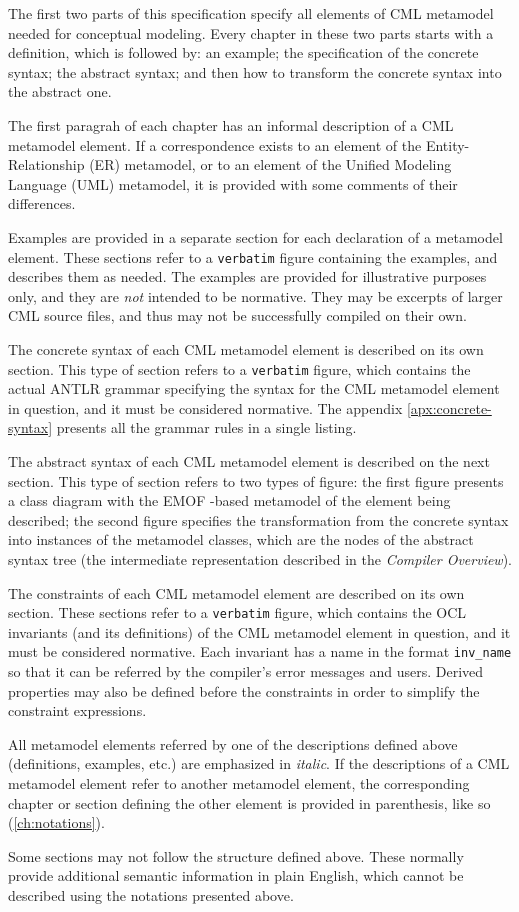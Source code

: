 The first two parts of this specification specify all elements of CML metamodel
needed for conceptual modeling.
Every chapter in these two parts starts with a definition,
which is followed by: an example;
the specification of the concrete syntax;
the abstract syntax;
and then how to transform the concrete syntax into the abstract one.

The first paragrah of each chapter has an informal description
of a CML metamodel element.
If a correspondence exists to an element of
the Entity-Relationship (ER) \cite{er} metamodel,
or to an element of the Unified Modeling Language (UML) \cite{uml} metamodel,
it is provided with some comments of their differences.

Examples are provided in a separate section
for each declaration of a metamodel element.
These sections refer to a \verb+verbatim+ figure containing the examples,
and describes them as needed.
The examples are provided for illustrative purposes only,
and they are \emph{not} intended to be normative.
They may be excerpts of larger CML source files,
and thus may not be successfully compiled on their own.

The concrete syntax of each CML metamodel element is described
on its own section.
This type of section refers to a \verb+verbatim+ figure,
which contains the actual ANTLR \cite{antlr} grammar
specifying the syntax for the CML metamodel element in question,
and it must be considered normative.
The appendix \ref{apx:concrete-syntax} presents all the grammar rules
in a single listing.

The abstract syntax of each CML metamodel element is described
on the next section.
This type of section refers to two types of figure:
the first figure presents a class diagram
with the EMOF \cite{mof}-based metamodel
of the element being described;
the second figure specifies the transformation
from the concrete syntax into instances of the metamodel classes,
which are the nodes of the abstract syntax tree
(the intermediate representation described in the \emph{Compiler Overview}).

The constraints of each CML metamodel element are described
on its own section.
These sections refer to a \verb+verbatim+ figure,
which contains the OCL \cite{ocl} invariants
(and its definitions)
of the CML metamodel element in question,
and it must be considered normative.
Each invariant has a name in the format \verb+inv_name+
so that it can be referred by the compiler's error messages
and users.
Derived properties may also be defined before the constraints
in order to simplify the constraint expressions.

All metamodel elements referred by one of the descriptions defined above
(definitions, examples, etc.) are emphasized in \emph{italic}.
If the descriptions of a CML metamodel element refer to another metamodel element,
the corresponding chapter or section defining the other element
is provided in parenthesis, like so (\ref{ch:notations}).

Some sections may not follow the structure defined above.
These normally provide additional semantic information in plain English,
which cannot be described using the notations presented above.
